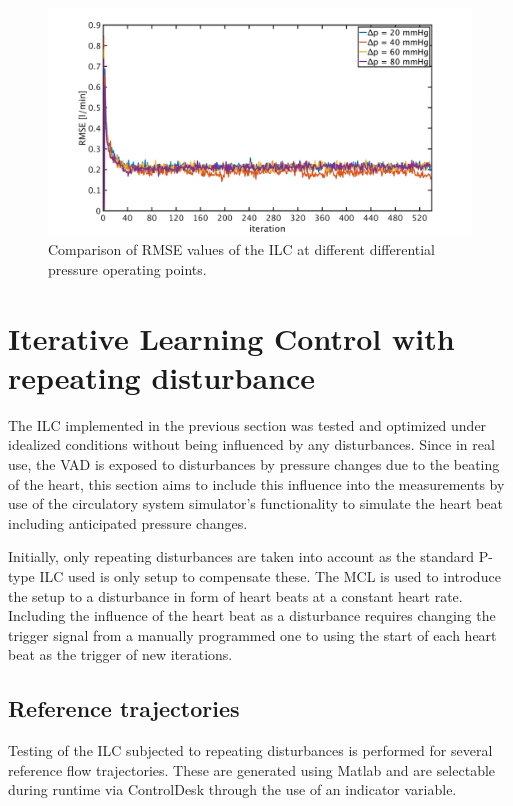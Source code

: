 \begin{figure}[ht]
  \centering
  \includegraphics[width=\textwidth]{images/chapt_5/ILC/RMSE_compare_operating_points.pdf}
  \caption[Comparison of RMSE values of the ILC at different differential pressure operating points]{Comparison of RMSE values of the ILC at different differential pressure operating points.}
  \label{fig:RMSE_compare_operating_points}
\end{figure}
\section{Iterative Learning Control with repeating disturbance}

The ILC implemented in the previous section was tested and optimized under idealized conditions without being influenced by any disturbances. Since in real use, the VAD is exposed to disturbances by pressure changes due to the beating of the heart, this section aims to include this influence into the measurements by use of the circulatory system simulator's functionality to simulate the heart beat including anticipated pressure changes.

Initially, only repeating disturbances are taken into account as the standard P-type ILC used is only setup to compensate these.
The MCL is used to introduce the setup to a disturbance in form of heart beats at a constant heart rate. Including the influence of the heart beat as a disturbance requires changing the trigger signal from a manually programmed one to using the start of each heart beat as the trigger of new iterations.
\subsection{Reference trajectories}\label{ref_traject}
Testing of the ILC subjected to repeating disturbances is performed for several reference flow trajectories. These are generated using Matlab and are selectable during runtime via ControlDesk through the use of an indicator variable.

